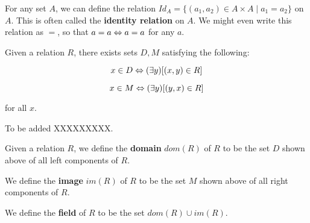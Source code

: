 \begin{example} 
\label{Example:_identity_relation}
For any set $A$, we can define the relation $Id_A=\{(a_1, a_2)\in A\times A\mid a_1 = a_2\}$ on $A$. This is often called the \textbf{identity relation} on $A$. We might even write this relation as $=$, so that $a=a\Leftrightarrow a=a$ for any $a$.
\end{example}

\begin{thm}
\label{Thm:_Domains_and_Images_of_relations}
Given a relation $R$, there exists sets $D, M$ satisfying the following: 

$$x\in D \Leftrightarrow (\exists y)[(x, y)\in R]$$ 

$$x\in M \Leftrightarrow (\exists y)[(y, x)\in R]$$

for all $x$. 
\end{thm}

\begin{prf}
To be added XXXXXXXXX. 
\end{prf}

\begin{defn}
\label{Defn:_Domains_and_Images_of_relations}
Given a relation $R$, we define the \textbf{domain} $dom(R)$ of $R$ to be the set $D$ shown above of all left components of $R$.

We define the \textbf{image} $im(R)$ of $R$ to be the set $M$ shown above of all right components of $R$. 

We define the \textbf{field} of $R$ to be the set $dom(R)\cup im(R)$.
\end{defn}
